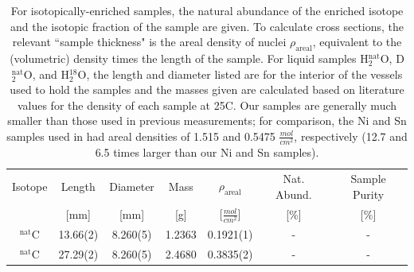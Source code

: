 \begin{table}[ht]
    \caption[Physical characteristics of samples used for neutron \tot\
    measurements]
    {
        For isotopically-enriched samples, the natural abundance
        of the enriched isotope and the isotopic fraction of the sample are
        given. To calculate cross sections, the relevant ``sample thickness" is the areal
        density of nuclei $\rho_{\text{areal}}$, equivalent to
        the (volumetric) density times the length of the sample. For liquid
        samples H$_{2}^{\text{nat}}$O, D$_{2}^{\text{nat}}$O, and H$_{2}^{18}$O,
        the length and diameter listed are for the interior of the vessels
        used to hold the samples and the masses given are calculated based on 
        literature values for the density of each sample at 25\textdegree{}C.
        Our samples are generally much smaller than those used in previous
        measurements; for comparison, the Ni and Sn samples used in \cite{Abfalterer2001,
        Finlay1993} had areal densities of 1.515 and 0.5475
        $\frac{mol}{cm^{2}}$, respectively (12.7 and 6.5 times larger than our
        Ni and Sn samples).
    }
    \label{SampleCharacteristics}
    \begin{center}
        \begin{tabular}{ c c c c c c c }
            \hline
            Isotope & Length & Diameter
            & Mass & $\rho_{\text{areal}}$ & Nat. Abund. & Sample Purity\\
                 & [mm] & [mm] & [g] & [$\frac{mol}{cm^{2}}$] & [\%] & [\%]\\
            \hline

            $^{\text{nat}}$C & 13.66(2) & 8.260(5) & 1.2363
            & 0.1921(1) & - & -\\
            $^{\text{nat}}$C & 27.29(2) & 8.260(5) & 2.4680
            & 0.3835(2) & - & -\\


\end{tabular}
\end{center}
\end{table}
